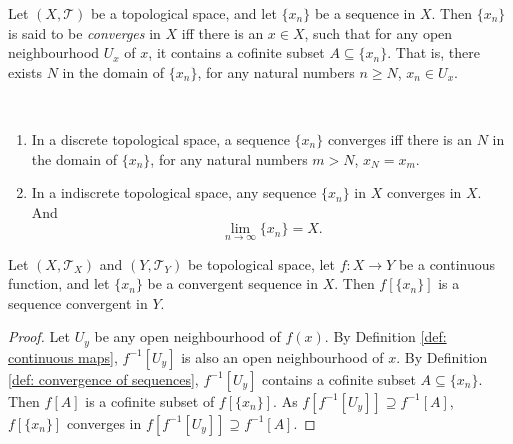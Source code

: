\begin{definition}
	\label{def: convergence of sequences}
	Let $(X, \mathcal T)$ be a topological space, and let $\{x_n\}$ be a sequence in $X$. Then $\{x_n\}$ is said to be \textit{converges} in $X$ iff there is an $x \in X$, such that for any open neighbourhood $U_x$ of $x$, it contains a cofinite subset $A \subseteq \{x_n\}$. That is, there exists $N$ in the domain of $\{x_n\}$, for any natural numbers $n \ge N$, $x_n \in U_x$.
\end{definition}


\begin{example}
	\
	\begin{enumerate}
		\item
		In a discrete topological space, a sequence $\{x_n\}$ converges iff there is an $N$ in the domain of $\{x_n\}$, for any natural numbers $m > N$, $x_N = x_m$.
		
		\item
		In a indiscrete topological space, any sequence $\{x_n\}$ in $X$ converges in $X$. And
		$$
		\lim_{n \to \infty} \{x_n\} = X.
		$$
	\end{enumerate}
\end{example}


\begin{proposition}
	Let $(X, \mathcal T_X)$ and $(Y, \mathcal T_Y)$ be topological space, let $f: X \to Y$ be a continuous function, and let $\{x_n\}$ be a convergent sequence in $X$. Then $f[\{x_n\}]$ is a sequence convergent in $Y$.
	
	\begin{proof}
		Let $U_y$ be any open neighbourhood of $f(x)$. By Definition \ref{def: continuous maps}, $f^{-1}[U_y]$ is also an open neighbourhood of $x$. By Definition \ref{def: convergence of sequences}, $f^{-1}[U_y]$ contains a cofinite subset $A \subseteq \{x_n\}$. Then $f[A]$ is a cofinite subset of $f[\{x_n\}]$. As $f[f^{-1}[U_y]] \supseteq f^{-1}[A]$, $f[\{x_n\}]$ converges in $f[f^{-1}[U_y]] \supseteq f^{-1}[A]$.
	\end{proof}		
\end{proposition}







































%